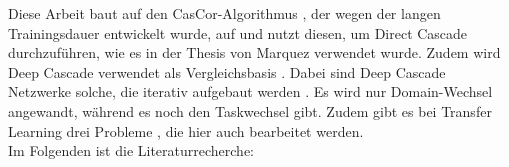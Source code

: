 Diese Arbeit baut auf den CasCor-Algorithmus \cite{cascor}, der wegen der langen Trainingsdauer entwickelt wurde, auf und nutzt diesen, 
um Direct Cascade \cite{cascade_network_architectures} 
durchzuführen, wie es in der Thesis von Marquez \cite{phd_deep_cascade} verwendet wurde. Zudem wird Deep Cascade verwendet als 
Vergleichsbasis \cite{deep_cascade_learning}. Dabei sind Deep Cascade Netzwerke solche, die iterativ aufgebaut werden \cite{Constructive_Cascade}. 
Es wird nur Domain-Wechsel angewandt, während es noch den Taskwechsel \cite{transfer_learning} gibt. Zudem gibt es bei Transfer Learning drei 
Probleme \cite{survey_transfer}, die hier auch bearbeitet werden. \\

Im Folgenden ist die Literaturrecherche: 





